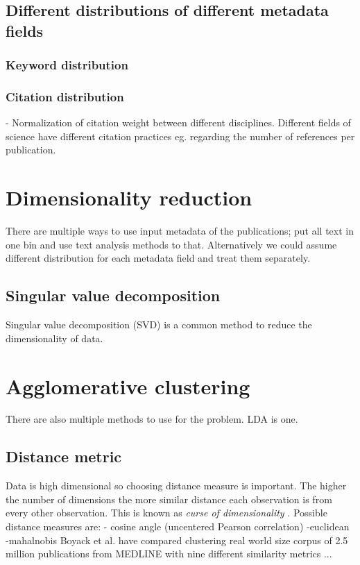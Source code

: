 \subsection{Different distributions of different metadata fields}
\subsubsection{Keyword distribution}
\subsubsection{Citation distribution}
- Normalization of citation weight between different disciplines.
  Different fields of science have different citation practices 
eg. regarding the number of references per publication. 
\cite{waltman_new_2012}


\section{Dimensionality reduction}
\label{sec:dimensionalityreduction}
There are multiple ways to use input metadata of the publications; 
put all text in one bin and use text analysis methods to that. 
Alternatively we could assume different distribution for each 
metadata field  and treat them
separately.
\subsection{Singular value decomposition}
Singular value decomposition (SVD) is a common method to reduce 
the dimensionality of data. 

\section{Agglomerative clustering}
\label{sec:agglomerativeclustering}
There are also multiple methods to use for the problem. LDA is one.

\subsection{Distance metric}
Data is high dimensional so choosing distance measure is 
important. The higher the number of dimensions the more similar 
distance each observation is from every other observation. This is
known as \emph{curse of dimensionality} .
Possible distance measures are:
- cosine angle (uncentered Pearson correlation)
-euclidean
-mahalnobis
Boyack et al. have compared clustering 
real world size corpus of 2.5 million publications from MEDLINE
with nine different similarity metrics \cite{boyack_clustering_2011}...

